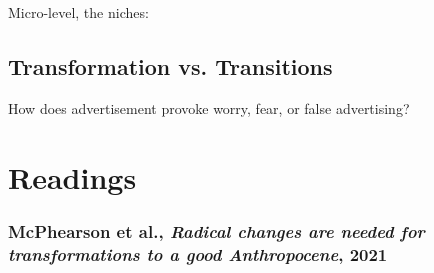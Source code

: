 \documentclass{article}
\begin{document}
Micro-level, the niches:

\subsection{Transformation vs. Transitions}

How does advertisement provoke worry, fear, or false advertising?


\section{Readings}

\subsubsection{McPhearson et al., \textit{Radical changes are needed for transformations to a good Anthropocene}, 2021}

\begin{outline}
	\1 
\end{outline}


\printbibliography
\end{document}
